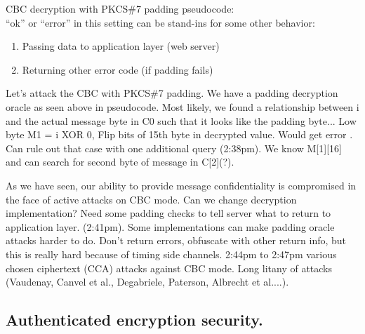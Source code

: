 CBC decryption with PKCS\#7 padding pseudocode:
\vspace{0.2cm}\\
``ok'' or ``error'' in this setting can be stand-ins for some other behavior:
\begin{enumerate}
    \item Passing data to application layer (web server)
    \item Returning other error code (if padding fails)
\end{enumerate}


Let's attack the CBC with PKCS\#7 padding. We have a padding decryption oracle as seen above in pseudocode. Most likely, we found a relationship between i and the actual message byte in C0 such that it looks like the padding byte...
Low byte M1 = i XOR 0, %
Flip bits of 15th byte in decrypted value. Would get error . Can rule out that case with one additional query (2:38pm).
We know M[1][16] and can search for second byte of message in C[2](?).

As we have seen, our ability to provide message confidentiality is compromised in the face of active attacks on CBC mode. Can we change decryption implementation? Need some padding checks to tell server what to return to application layer. (2:41pm). Some implementations can make padding oracle attacks harder to do. Don't return errors, obfuscate with other return info, but this is really hard because of timing side channels.
2:44pm to 2:47pm various chosen ciphertext (CCA) attacks against CBC mode. Long litany of attacks (Vaudenay, Canvel et al., Degabriele,
Paterson, Albrecht et al....).

\subsection{Authenticated encryption security.}

